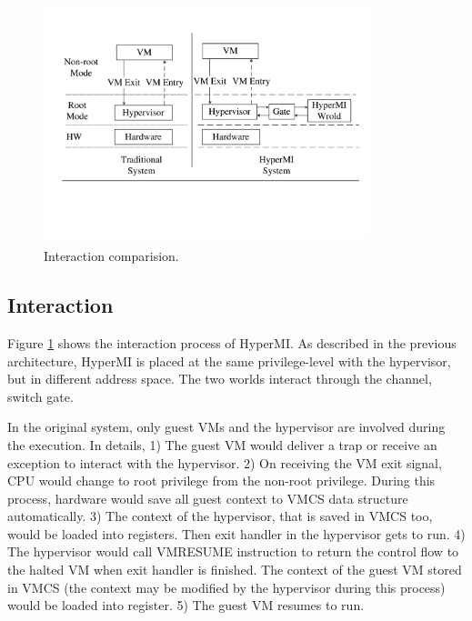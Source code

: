 \documentclass[conference]{IEEEtran}
\begin{document}
\begin{figure}
\centerline{\includegraphics[width=9.5cm, height=7cm]{pdfvmcsProcess.pdf}}
\caption{Interaction comparision. } \label{fig+1}
\end{figure}

\subsection{Interaction} \label{IN}


Figure \ref{fig+1} shows the interaction process of HyperMI. 
As described in the previous architecture, HyperMI is placed at the same privilege-level with the hypervisor, but in different address space. The two worlds interact through the channel, switch gate.


In the original system, only guest VMs and the hypervisor are involved during the execution. In details, 1) The guest VM would deliver a trap or receive an exception to interact with the hypervisor. 2) On receiving the VM exit signal, CPU would change to root privilege from the non-root privilege. During this process, hardware would save all guest context to VMCS data structure automatically. 3) The context of the hypervisor, that is saved in VMCS too, would be loaded into registers. Then exit handler in the hypervisor gets to run. 4) The hypervisor would call VMRESUME instruction to return the control flow to the halted VM when exit handler is finished. The context of the guest VM stored in VMCS (the context may be modified by the hypervisor during this process) would be loaded into register. 5) The guest VM resumes to run.
\end{document}
